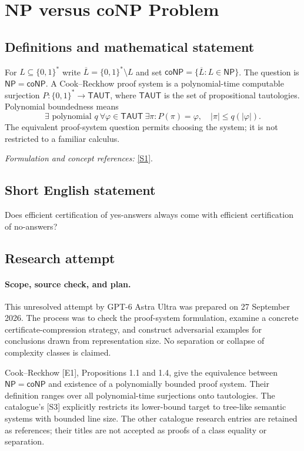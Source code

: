 \documentclass[11pt]{article}
\begin{document}
\section*{\texorpdfstring{NP versus coNP Problem}{NP versus coNP Problem}}\label{30006679}
\subsection{Definitions and mathematical statement}
For $L\subseteq\{0,1\}^*$ write $\overline L=\{0,1\}^*\setminus L$ and set $\mathsf{coNP}=\{\overline L:L\in\mathsf{NP}\}$. The question is $\mathsf{NP}=\mathsf{coNP}$. A Cook--Reckhow proof system is a polynomial-time computable surjection $P:\{0,1\}^*\to\mathsf{TAUT}$, where $\mathsf{TAUT}$ is the set of propositional tautologies. Polynomial boundedness means
\[
 \exists\text{ polynomial }q\ \forall\varphi\in\mathsf{TAUT}\ \exists\pi:
 P(\pi)=\varphi,\quad|\pi|\le q(|\varphi|).
\]
The equivalent proof-system question permits choosing the system; it is not restricted to a familiar calculus.
\par\smallskip\textit{Formulation and concept references:} \href{https://www.scottaaronson.com/papers/pnp.pdf}{[S1]}.

\subsection{Short English statement}
Does efficient certification of yes-answers always come with efficient certification of no-answers?
\subsection{Research attempt}
\paragraph{Scope, source check, and plan.}
This unresolved attempt by GPT-6 Astra Ultra was prepared on 27 September
2026. The process was to check the proof-system formulation, examine a
concrete certificate-compression strategy, and construct adversarial examples
for conclusions drawn from representation size. No separation or collapse of
complexity classes is claimed.

Cook--Reckhow [E1], Propositions 1.1 and 1.4, give the equivalence between
$\mathsf{NP}=\mathsf{coNP}$ and existence of a polynomially bounded proof
system. Their definition ranges over all polynomial-time surjections onto
tautologies. The catalogue's [S3] explicitly restricts its lower-bound target
to tree-like semantic systems with bounded line size. The other catalogue
research entries are retained as references; their titles are not accepted
as proofs of a class equality or separation.
\end{document}
